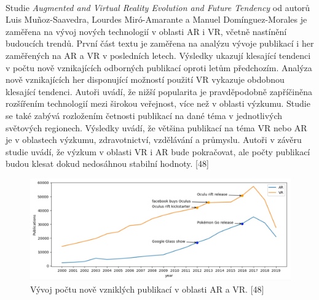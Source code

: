 \documentclass[a4paper, 12pt]{report}
\begin{document}
\\
Studie \textit{Augmented and Virtual Reality Evolution and Future Tendency} od autorů Luis Muñoz-Saavedra, Lourdes Miró-Amarante a Manuel Domínguez-Morales je zaměřena na vývoj nových technologií v oblasti AR i VR, včetně nastínění budoucích trendů. První část textu je zaměřena na analýzu vývoje publikací i her zaměřených na AR a VR v posledních letech. Výsledky ukazují klesající tendenci v počtu nově vznikajících odborných publikací oproti letům předchozím. Analýza nově vznikajících her disponující možností použití VR vykazuje obdobnou klesající tendenci. Autoři uvádí, že nižší popularita je pravděpodobně zapříčiněna rozšířením technologií mezi širokou veřejnost, více než v oblasti výzkumu. Studie se také zabývá rozložením četnosti publikací na dané téma v jednotlivých světových regionech. Výsledky uvádí, že většina publikací na téma VR nebo AR je v oblastech výzkumu, zdravotnictví, vzdělávání a průmyslu. Autoři v závěru studie uvádí, že výzkum v oblasti VR i AR bude pokračovat, ale počty publikací budou klesat dokud nedosáhnou stabilní hodnoty. [48]

\begin{figure}[h!]
	\centering
	\includegraphics[width=16cm]{publikace_VR.jpg}
	\caption{Vývoj počtu nově vzniklých publikací v oblasti AR a VR. [48]}
\end{figure}
\end{document}
